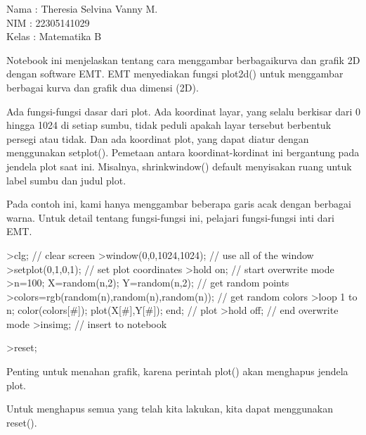 \documentclass[a4paper,10pt]{article}
\begin{document}
\begin{eulernotebook}
\begin{eulercomment}
Nama  : Theresia Selvina Vanny M.\\
NIM   : 22305141029\\
Kelas : Matematika B

\begin{eulercomment}
\begin{eulercomment}
Notebook ini menjelaskan tentang cara menggambar berbagaikurva dan
grafik 2D dengan software EMT. EMT menyediakan fungsi plot2d() untuk
menggambar berbagai kurva dan grafik dua dimensi (2D).\\
\end{eulercomment}
\begin{eulercomment}
Ada fungsi-fungsi dasar dari plot. Ada koordinat layar, yang selalu
berkisar dari 0 hingga 1024 di setiap sumbu, tidak peduli apakah layar
tersebut berbentuk persegi atau tidak. Dan ada koordinat plot, yang
dapat diatur dengan menggunakan setplot(). Pemetaan antara
koordinat-kordinat ini bergantung pada jendela plot saat ini.
Misalnya, shrinkwindow() default menyisakan ruang untuk label sumbu
dan judul plot.

Pada contoh ini, kami hanya menggambar beberapa garis acak dengan
berbagai warna. Untuk detail tentang fungsi-fungsi ini, pelajari
fungsi-fungsi inti dari EMT.
\end{eulercomment}
\begin{eulerprompt}
>clg; // clear screen
>window(0,0,1024,1024); // use all of the window
>setplot(0,1,0,1); // set plot coordinates
>hold on; // start overwrite mode
>n=100; X=random(n,2); Y=random(n,2);  // get random points
>colors=rgb(random(n),random(n),random(n)); // get random colors
>loop 1 to n; color(colors[#]); plot(X[#],Y[#]); end; // plot
>hold off; // end overwrite mode
>insimg; // insert to notebook
\end{eulerprompt}
\begin{eulerprompt}
>reset;
\end{eulerprompt}
\begin{eulercomment}
Penting untuk menahan grafik, karena perintah plot() akan menghapus
jendela plot.

Untuk menghapus semua yang telah kita lakukan, kita dapat menggunakan
reset().


\end{eulercomment}
\end{eulercomment}
\end{eulercomment}
\end{eulernotebook}
\end{document}
